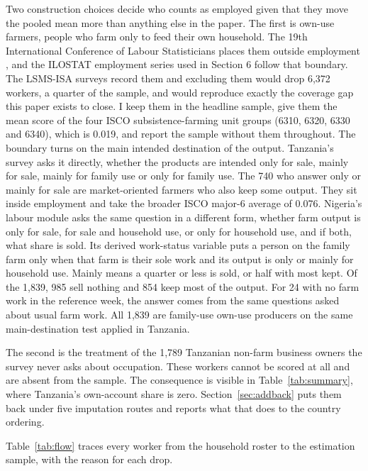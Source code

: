 Two construction choices decide who counts as employed given that they move 
the pooled mean more than anything else in
the paper.
The first is own-use farmers, people who farm only to feed their own household.
The 19th International Conference of Labour Statisticians places them outside
employment \citep{icls2013}, and the ILOSTAT employment series used in
Section 6 follow that boundary. 
The LSMS-ISA surveys record them and excluding them would drop 6,372 workers, a quarter
of the sample, and would reproduce exactly the coverage gap this paper exists to
close. I keep them in the headline sample, give them the mean score of the four
ISCO subsistence-farming unit groups (6310, 6320, 6330 and 6340), which is
0.019, and report the sample without them throughout. The boundary turns on
the main intended destination of the output. Tanzania's survey asks it
directly, whether the products are intended only for sale, mainly for sale,
mainly for family use or only for family use. The 740 who answer only or
mainly for sale are market-oriented farmers who also keep some output. They
sit inside employment and take the broader ISCO major-6 average of 0.076.
Nigeria's labour module asks the same question in a different form, whether
farm output is only for sale, for sale and household use, or only for
household use, and if both, what share is sold. Its derived work-status
variable puts a person on the family farm only when that
farm is their sole work and its output is only or mainly for household use.
Mainly means a quarter or less is sold, or half with most kept. Of the 1,839,
985 sell nothing and 854 keep most of the output. For 24 with no farm work in
the reference week, the answer comes from the same questions asked about
usual farm work. All 1,839 are family-use own-use producers on the
same main-destination test applied in Tanzania.

The second is the treatment of the 1,789 Tanzanian non-farm business owners the
survey never asks about occupation. These workers cannot be scored at all and
are absent from the sample. The consequence is visible in
Table~\ref{tab:summary}, where Tanzania's own-account share is zero.
Section~\ref{sec:addback} puts them back under five imputation routes and
reports what that does to the country ordering.

Table~\ref{tab:flow} traces every worker from the household roster to the
estimation sample, with the reason for each drop.

